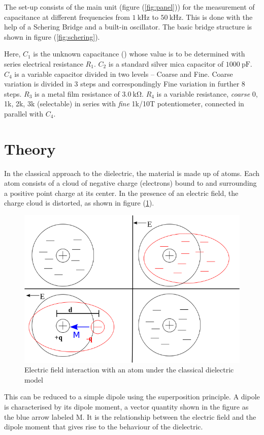 \documentclass[%
 aip,
 amsmath,amssymb,
 reprint, floatfix%
]{revtex4-1}
\begin{document}
    The set-up consists of the main unit (figure (\ref{fig:panel})) for the measurement of capacitance at different frequencies from $\SI{1}{\kilo \hertz}$ to $\SI{50}{\kilo \hertz}$. This is done with the help of a Schering Bridge and a built-in oscillator. The basic bridge structure is shown in figure (\ref{fig:schering}).
    \par
    Here, $C_1$ is the unknown capacitance () whose value is to be determined with series electrical resistance $R_1$. $C_2$ is a standard silver mica capacitor of $\SI{1000}{\pico \farad}$. $C_4$ is a variable capacitor divided in two levels – Coarse and Fine. Coarse variation is divided in 3 steps and correspondingly Fine variation in further 8 steps. $R_3$ is a metal film resistance of $\SI{3.0}{\kilo \ohm}$. $R_4$ is a variable resistance, \textit{coarse} 0, 1k, 2k, 3k (selectable) in series with \textit{fine} 1k/10T potentiometer, connected in parallel with $C_4$.


\section{Theory}
    In the classical approach to the dielectric, the material is made up of atoms. Each atom consists of a cloud of negative charge (electrons) bound to and surrounding a positive point charge at its center. In the presence of an electric field, the charge cloud is distorted, as shown in figure (\ref{fig:dielectric-model}).
    \begin{figure}
        \centering
        \includegraphics[scale = 0.35]{Figures/640px-Dielectric_model.svg.png}
        \caption{Electric field interaction with an atom under the classical dielectric model}
        \label{fig:dielectric-model}
    \end{figure}
    \par
    This can be reduced to a simple dipole using the superposition principle. A dipole is characterised by its dipole moment, a vector quantity shown in the figure as the blue arrow labeled M. It is the relationship between the electric field and the dipole moment that gives rise to the behaviour of the dielectric.
\end{document}
